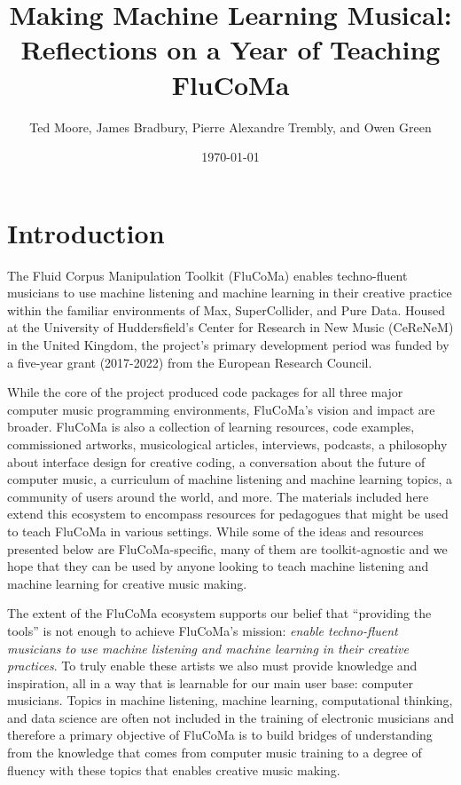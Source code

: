 \documentclass{article}
\title{\textbf{Making Machine Learning Musical: Reflections on a Year of Teaching FluCoMa}}
\author{Ted Moore, James Bradbury, Pierre Alexandre Trembly, and Owen Green}
\date{\today}
\begin{document}
\maketitle
\pagebreak

\tableofcontents
\pagebreak

\section{Introduction}\label{introduction}

The Fluid Corpus Manipulation Toolkit (FluCoMa) enables techno-fluent
musicians to use machine listening and machine learning in their
creative practice within the familiar environments of Max,
SuperCollider, and Pure Data. Housed at the University of Huddersfield's
Center for Research in New Music (CeReNeM) in the United Kingdom, the
project's primary development period was funded by a five-year grant
(2017-2022) from the European Research Council.

While the core of the project produced code packages for all three major
computer music programming environments, FluCoMa's vision and impact are
broader. FluCoMa is also a collection of learning resources, code
examples, commissioned artworks, musicological articles, interviews,
podcasts, a philosophy about interface design for creative coding, a
conversation about the future of computer music, a curriculum of machine
listening and machine learning topics, a community of users around the
world, and more. The materials included here extend this ecosystem to
encompass resources for pedagogues that might be used to teach FluCoMa
in various settings. While some of the ideas and resources presented
below are FluCoMa-specific, many of them are toolkit-agnostic and we
hope that they can be used by anyone looking to teach machine listening
and machine learning for creative music making.

The extent of the FluCoMa ecosystem supports our belief that ``providing
the tools'' is not enough to achieve FluCoMa's mission: \emph{enable
techno-fluent musicians to use machine listening and machine learning in
their creative practices}. To truly enable these artists we also must
provide knowledge and inspiration, all in a way that is learnable for
our main user base: computer musicians. Topics in machine listening,
machine learning, computational thinking, and data science are often not
included in the training of electronic musicians and therefore a primary
objective of FluCoMa is to build bridges of understanding from the
knowledge that comes from computer music training to a degree of fluency
with these topics that enables creative music making.
\end{document}
